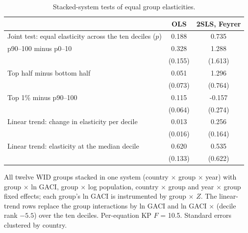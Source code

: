 \begin{table}[H]
\centering
\caption{Stacked-system tests of equal group elasticities.}
\label{tab:a_stacked}
\begin{threeparttable}
\small
\begin{tabular}{lcc}
\toprule
 & OLS & 2SLS, Feyrer \\
\midrule
Joint test: equal elasticity across the ten deciles ($p$) & 0.188 & 0.735 \\
p90--100 minus p0--10 & 0.328\sym{**} & 1.288 \\
 & (0.155) & (1.613) \\
Top half minus bottom half & 0.051 & 1.296\sym{*} \\
 & (0.073) & (0.764) \\
Top 1\% minus p90--100 & 0.115\sym{*} & -0.157 \\
 & (0.064) & (0.274) \\
Linear trend: change in elasticity per decile & 0.013 & 0.256 \\
 & (0.016) & (0.164) \\
Linear trend: elasticity at the median decile & 0.620\sym{***} & 0.535 \\
 & (0.133) & (0.622) \\
\bottomrule
\end{tabular}
\begin{tablenotes}\small
\item All twelve WID groups stacked in one system (country $\times$ group $\times$ year) with group $\times$ ln GACI, group $\times$ log population, country $\times$ group and year $\times$ group fixed effects; each group's ln GACI is instrumented by group $\times$ $Z$. The linear-trend rows replace the group interactions by ln GACI and ln GACI $\times$ (decile rank $-5.5$) over the ten deciles. Per-equation KP $F$ = 10.5. Standard errors clustered by country.
\end{tablenotes}
\end{threeparttable}
\end{table}
